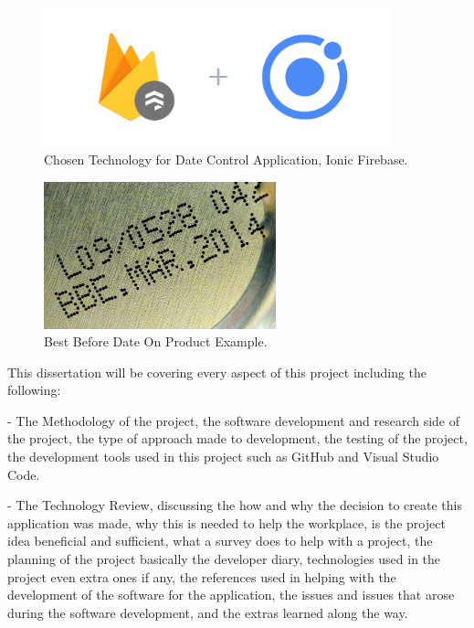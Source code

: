 \begin{figure}[h!]
	\caption{Chosen Technology for Date Control Application, Ionic Firebase.}
	\label{image:ionicfirebase}
	\centering
	\includegraphics[width=0.9\textwidth]{images/ionicfirebase.png}
\end{figure}
\newpage
\begin{figure}[h!]
	\caption{Best Before Date On Product Example.}
	\label{image:bbdate}
	\centering
	\includegraphics[width=0.60\textwidth]{images/bbdate222.jpg}
\end{figure}

This dissertation will be covering every aspect of this project including the following:
\newline 

- The Methodology of the project, the software development and research side of the project, the type of approach made to development, the testing of the project, the development tools used in this project such as GitHub and Visual Studio Code.
\newline

- The Technology Review, discussing the how and why the decision to create this application was made, why this is needed to help the workplace, is the project idea beneficial and sufficient, what a survey does to help with a project, the planning of the project basically the developer diary, technologies used in the project even extra ones if any, the references used in helping with the development of the software for the application, the issues and issues that arose during the software development, and the extras learned along the way.
\newline

